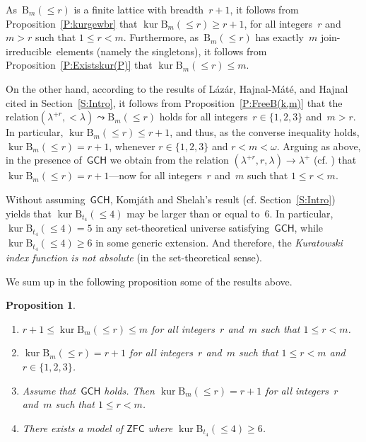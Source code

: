 \documentclass[psamsfonts,reqno]{amsart}
\theoremstyle{plain}
\newtheorem{proposition}[lemma]{Proposition}
\theoremstyle{definition}
\theoremstyle{remark}
\numberwithin{equation}{section}
\numberwithin{figure}{section}
\newcommand{\gl}{\lambda}
\newcommand{\go}{\omega}
\newcommand{\les}{\leqslant}
\DeclareMathOperator{\kur}{kur}
\newcommand{\jirr}{join-ir\-re\-duc\-i\-ble}
\newcommand{\set}[1]{\{#1\}}
\newcommand{\rB}{\mathrm{B}}
\begin{document}
As~$\rB_m({\les}r)$ is a finite lattice with breadth~$r+1$, it follows from Proposition~\ref{P:kurgewbr} that $\kur\rB_m({\les}r)\geq r+1$, for all integers~$r$ and~$m>r$ such that $1\leq r<m$. Furthermore, as~$\rB_m({\les}r)$ has exactly~$m$ \jirr\ elements (namely the singletons), it follows from Proposition~\ref{P:Existskur(P)} that $\kur\rB_m({\les}r)\leq m$.

On the other hand, according to the results of L\'az\'ar, Hajnal-M\'at\'e, and Hajnal cited in Section~\ref{S:Intro}, it follows from Proposition~\ref{P:FreeB(k,m)} that the relation\linebreak $(\gl^{+r},{<}\gl)\leadsto\rB_m({\les}r)$ holds for all integers~$r\in\set{1,2,3}$ and~$m>r$. In particular, $\kur\rB_m({\les}r)\leq r+1$, and thus, as the converse inequality holds, $\kur\rB_m({\les}r)=r+1$, whenever $r\in\set{1,2,3}$ and $r<m<\go$. Arguing as above, in the presence of~$\mathsf{GCH}$ we obtain from the relation $(\gl^{+r},r,\gl)\to\gl^+$ (cf. \cite[Theorem~45.5]{EHMR}) that $\kur\rB_m({\les}r)=r+1$---now for all integers~$r$ and~$m$ such that $1\leq r<m$.

Without assuming~$\mathsf{GCH}$, Komj\'ath and Shelah's result (cf. Section~\ref{S:Intro}) yields that $\kur\rB_{t_4}({\les}4)$ may be larger than or equal to~$6$. In particular, $\kur\rB_{t_4}({\les}4)=5$ in any set-theoretical universe satisfying~$\mathsf{GCH}$, while $\kur\rB_{t_4}({\les}4)\geq6$ in some generic extension. And therefore, the \emph{Kuratowski index function is not absolute} (in the set-theoretical sense).

We sum up in the following proposition some of the results above.

\begin{proposition}\label{P:MoreKurB(r,m)}\hfill
\begin{enumerate}
\item $r+1\leq\kur\rB_m({\les}r)\leq m$ for all integers~$r$ and~$m$ such that $1\leq r<m$.

\item $\kur\rB_m({\les}r)=r+1$ for all integers~$r$ and~$m$ such that $1\leq r<m$ and $r\in\set{1,2,3}$.

\item Assume that~$\mathsf{GCH}$ holds. Then $\kur\rB_m({\les}r)=r+1$ for all integers~$r$ and~$m$ such that $1\leq r<m$.

\item There exists a model of $\mathsf{ZFC}$ where $\kur\rB_{t_4}({\les}4)\geq6$.
\end{enumerate}
\end{proposition}
\end{document}
